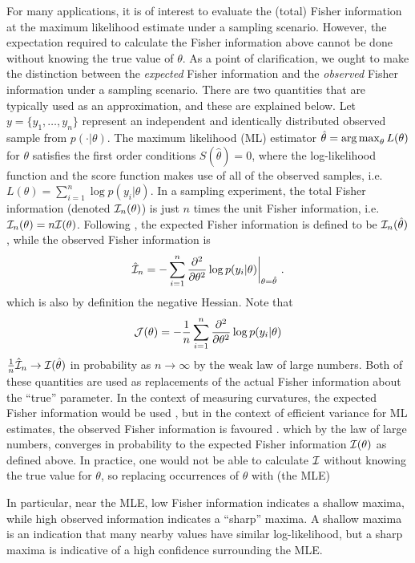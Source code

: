 For many applications, it is of interest to evaluate the (total) Fisher information at the maximum likelihood estimate under a sampling scenario.
However, the expectation required to calculate the Fisher information above cannot be done without knowing the true value of $\theta$.
As a point of clarification, we ought to make the distinction between the \emph{expected} Fisher information and the \emph{observed} Fisher information under a sampling scenario.
There are two quantities that are typically used as an approximation, and these are explained below.
Let $y = \{y_1,\dots,y_n\}$ represent an independent and identically distributed observed sample from $p(\cdot|\theta)$.
The maximum likelihood (ML) estimator $\hat\theta = \operatorname*{arg\,max}_\theta L(\theta)$ for $\theta$ satisfies the first order conditions $S(\hat\theta) = 0$, where the log-likelihood function and the score function makes use of all of the observed samples, i.e. $L(\theta) = \sum_{i=1}^n \log p(y_i|\theta)$.
In a sampling experiment, the total Fisher information (denoted ${\mathcal I}_n(\theta)$) is just $n$ times the unit Fisher information, i.e. ${\mathcal I}_n(\theta) = n{\mathcal I}(\theta)$.
Following \citet{efron1978assessing}, the expected Fisher information is defined to be ${\mathcal I}_n(\hat\theta)$, while the observed Fisher information is
\[
  \hat{{\mathcal I}}_n = -\sum_{i=1}^n \frac{\partial ^ 2}{\partial\theta^2} \log p(y_i|\theta) \bigg|_{\theta = \hat\theta} \ .
\]
which is also by definition the negative Hessian. 
Note that 
\[
  {\mathcal J}(\theta) = -\frac{1}{n} \sum_{i=1}^n \frac{\partial ^ 2}{\partial\theta^2} \log p(y_i|\theta) 
\]
$\frac{1}{n}\hat{{\mathcal I}}_n \to {\mathcal I}(\hat\theta)$ in probability as $n\to\infty$ by the weak law of large numbers.
Both of these quantities are used as replacements of the actual Fisher information about the ``true'' parameter.
In the context of measuring curvatures, the expected Fisher information would be used \citep{pawitan2001all}, but in the context of efficient variance for ML estimates, the observed Fisher information is favoured \citep{efron1978assessing}.
which by the law of large numbers, converges in probability to the expected Fisher information ${\mathcal I}(\theta)$ as defined above.
In practice, one would not be able to calculate ${\mathcal I}$ without knowing the true value for $\theta$, so replacing occurrences of $\theta$ with  (the MLE)

In particular, near the MLE, low Fisher information indicates a shallow maxima, while high observed information indicates a ``sharp'' maxima.
A shallow maxima is an indication that many nearby values have similar log-likelihood, but a sharp maxima is indicative of a high confidence surrounding the MLE.

